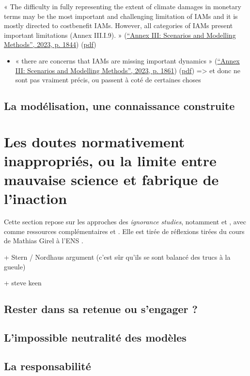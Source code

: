 « The difficulty in fully representing the extent of climate damages in monetary terms may be the most important and challenging limitation of IAMs and it is mostly directed to costbenefit IAMs. However, all categories of IAMs present important limitations (Annex III.I.9). » (\href{zotero://select/library/items/2SDDNUUF}{“Annex III: Scenarios and Modelling Methods”, 2023, p. 1844}) (\href{zotero://open-pdf/library/items/CHVFSLLH?page=4&annotation=YT933ZM4}{pdf})
 

\begin{itemize}
    \item « there are concerns that IAMs are missing important dynamics » (\href{zotero://select/library/items/2SDDNUUF}{“Annex III: Scenarios and Modelling Methods”, 2023, p. 1861}) (\href{zotero://open-pdf/library/items/CHVFSLLH?page=21&annotation=WDMBNU3A}{pdf})
=> et donc ne sont pas vraiment précis, ou passent à coté de certaines choses

\end{itemize}
 



 \subsection{La modélisation, une connaissance construite}


\section{Les doutes normativement inappropriés, ou la limite entre mauvaise science et fabrique de l'inaction}

Cette section repose sur les approches des \textit{ignorance studies}, notamment \cite{melo-martin_fight_2018} et \cite{gross_routledge_2015}, avec comme ressources complémentaires \cite{noauthor_carnet_2024} et \cite{proctor_agnotology_2008}. Elle est tirée de réflexions tirées du cours de Mathias Girel à l'ENS \cite{girel_vertus_2023}. 



+ Stern / Nordhaus argument (c'est sûr qu'ils se sont balancé des trucs à la gueule) 

+ steve keen \cite{keen_appallingly_2021}

\subsection{Rester dans sa retenue ou s'engager ?}

\subsection{L'impossible neutralité des modèles}

\subsection{La responsabilité}




